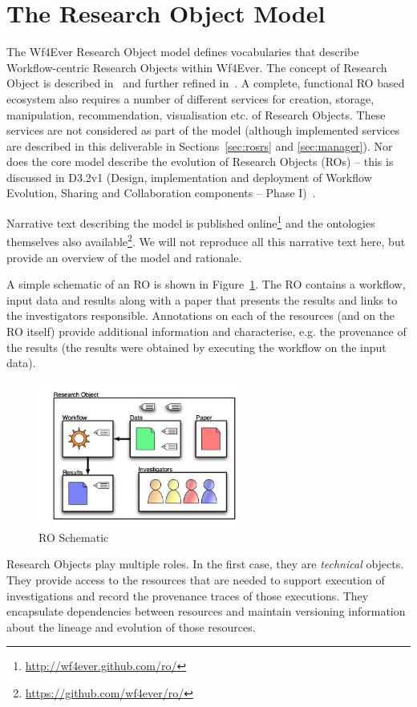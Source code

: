 \section{The Research Object Model}
\label{sec:model}

The Wf4Ever Research Object model defines vocabularies that describe Workflow-centric Research Objects within Wf4Ever. The concept of Research Object is described in~\cite{bechhofer11:not-enough} and further refined in~\cite{belhajjame12:citizens}. A complete, functional RO based ecosystem also requires a number of different services for creation, storage, manipulation, recommendation, visualisation etc. of Research Objects. These services are not considered as part of the model (although implemented services are described in this deliverable in Sections~\ref{sec:rosrs} and \ref{sec:manager}). Nor does the core model describe the evolution of Research Objects (ROs) -- this is discussed in D3.2v1 (Design, implementation and deployment of Workflow Evolution, Sharing and Collaboration components -- Phase I)~\cite{D3.2v1}.

Narrative text describing the model is published online\footnote{\url{http://wf4ever.github.com/ro/}} and the ontologies themselves also available\footnote{\url{https://github.com/wf4ever/ro/}}. We will not reproduce all this narrative text here, but provide an overview of the model and rationale.

A simple schematic of an RO is shown in Figure~\ref{fig:ro}. The RO contains a workflow, input data and results along with a paper that presents the results and links to the investigators responsible. Annotations on each of the resources (and on the RO itself) provide additional information and characterise, e.g. the provenance of the results (the results were obtained by executing the workflow on the input data). 

\begin{figure}[ht]
  \centering
  \includegraphics[width=0.6\textwidth]{Figures/RO-cartoon}
  \caption{RO Schematic}
  \label{fig:ro}
\end{figure}
 Research Objects play multiple roles. In the first case, they are \emph{technical} objects. They provide access to the resources that are needed to support execution of investigations and record the provenance traces of those executions. They encapsulate dependencies between resources and maintain versioning information about the lineage and evolution of those resources.

